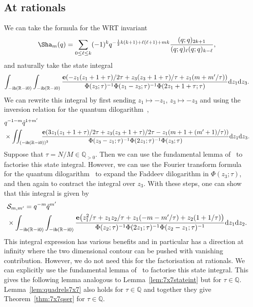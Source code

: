 \documentclass[pdftex]{sigma}
\numberwithin{equation}{section}
\def\BQ{\mathbb{Q}}
\def\BR{\mathbb{R}}
\def\tq{\tilde{q}}
\def\e{\mathbf e}
\def\WRT{\Sha}
\def\BQ{\mathbb Q}
\def\BR{\mathbb R}
\def\calS{\mathcal S}
\def\tq{\tilde{q}}
\begin{document}
\subsection{At rationals}


We can take the formula for the WRT invariant
\[
 \WRT_{m}(q)
  =
 \sum_{0\leq\ell\leq k}(-1)^{k}q^{-\frac{1}{2}k(k+1)+\ell(\ell+1)+mk}\frac{(q;q)_{2k+1}}{(q;q)_{\ell}(q;q)_{k-\ell}} ,
\]
and naturally take the state integral
\[%
 \int_{-{\rm i}\mathsf{b}(\BR-{\rm i}0)} \int_{-{\rm i}\mathsf{b}(\BR-{\rm i}0)}
 \frac{\e(-z_1(z_1+1+\tau)/2\tau+z_3(z_3+1+\tau)/\tau+z_1(m+m'/\tau))}{\Phi(z_3;\tau)^{-1}\Phi(z_1-z_3;\tau)^{-1}\Phi(2z_1+1+\tau;\tau)}{\rm d}z_1{\rm d}z_3 .
\]
We can rewrite this integral by first sending $z_1\mapsto -z_1$, $z_3\mapsto -z_3$ and using the inversion relation for the quantum dilogarithm~\cite[Appendix~A]{AK:I},
\begin{align}\label{eq:stateint.4112.v2}
& q^{-1-m}\tq^{1+m'}\\
&  \nonumber\times \iint_{(-{\rm i}\mathsf{b}(\BR-{\rm i}0))^2} \!\!\!\!\!\!\!\! \frac{\e(3z_1(z_1+1+\tau)/2\tau+z_3(z_3+1+\tau)/2\tau-z_1(m+1+(m'+1)/\tau))}{\Phi(z_3-z_1;\tau)^{-1}\Phi(2z_1;\tau)^{-1}\Phi(z_3;\tau)}{\rm d}z_1{\rm d}z_3.
\end{align}
Suppose that $\tau=N/M\in\BQ_{>0}$. Then we can use the fundamental lemma of~\cite[Lemma~2.1]{GK:rat} to factorise this state integral. However, we can use the Fourier transform formula for the quantum dilogarithm~\cite[Appendix~A]{AK:I} to expand the Faddeev dilogarithm in $\Phi(z_{3};\tau)$, and then again to contract the integral over $z_3$. With these steps, one can show that this integral is given by
\begin{align*}%
&\calS_{m,m'}
=
 q^{-m}\tq^{m'} \\
& \times \int_{-{\rm i}\mathsf{b}(\BR-{\rm i}0)} \int_{-{\rm i}\mathsf{b}(\BR-{\rm i}0)} \frac{\e\bigl(z_1^2/\tau+z_1z_2/\tau+z_1(-m-m'/\tau)+z_2(1+1/\tau)\bigr)}{\Phi(z_2;\tau)^{-1}\Phi(2z_1;\tau)^{-1}\Phi(z_2-z_1;\tau)^{-1}}{\rm d}z_1{\rm d}z_2 .
\end{align*}
This integral expression has various benefits and in particular has a direction at infinity where the two dimensional contour can be pushed with vanishing contribution. However, we do not need this for the factorisation at rationals. We can explicitly use the fundamental lemma of~\cite[Lemma~2.1]{GK:rat} to factorise this state integral. This gives the following lemma analogous to Lemma~\ref{lem:7x7stateint} but for $\tau\in\BQ$. Lemma~\ref{lem:quadrels7x7} also holds for $\tau\in\BQ$ and together they give Theorem~\ref{thm:7x7qser} for $\tau\in\BQ$.
\end{document}
